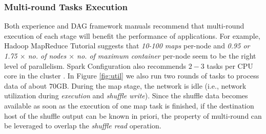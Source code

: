 \subsubsection{Multi-round Tasks Execution}\label{multi}
Both experience and DAG framework manuals recommend that multi-round execution of each stage will benefit the performance of applications.
For example, Hadoop MapReduce Tutorial  \cite{hadooptutorial} suggests that \textit{10-100 maps} per-node and \textit{0.95 or 1.75 $\times$ no. of nodes $\times$ no. of maximum container} per-node seem to be the right level of parallelism. Spark Configuration also recommends $2-3$ tasks per CPU core in the cluster \cite{sparkconf}.
In Figure \ref{fig:util} we also run two rounds of tasks to process data of about $70$GB. During the map stage, the network is idle (i.e., network utilization during \textit{execution} and \textit{shuffle write}). Since the shuffle data becomes available as soon as the execution of one map task is finished, if the destination host of the shuffle output can be known in priori, the property of multi-round can be leveraged to overlap the \textit{shuffle read} operation.

